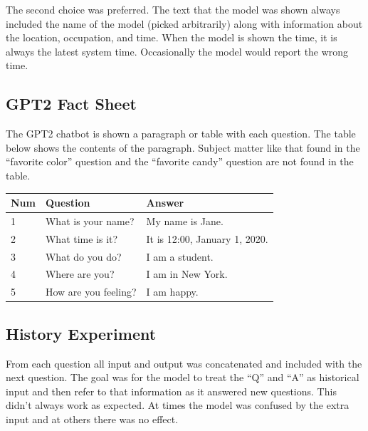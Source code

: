 The second choice was preferred. The text that the model was shown always included the name of the model (picked arbitrarily) along with information about the location, occupation, and time. When the model is shown the time, it is always the latest system time. Occasionally the model would report the wrong time. %

\subsection{GPT2 Fact Sheet}

The GPT2 chatbot is shown a paragraph or table with each question. The table below shows the contents of the paragraph. Subject matter like that found in the ``favorite color'' question and the ``favorite candy'' question are not found in the table.

\begin{table}[h]
	\begin{center}	
		
		\begin{tabular}{lll}
			Num & Question             & Answer                        \\
			\hline \hline
			1   & What is your name?   & My name is Jane.              \\
			2   & What time is it?     & It is 12:00, January 1, 2020. \\
			3   & What do you do?      & I am a student.               \\
			4   & Where are you?       & I am in New York.             \\
			5   & How are you feeling? & I am happy.                  \\
			\hline     
		\end{tabular}
	\end{center}
	\label{fig-fact-sheet}
	
\end{table}


\subsection{History Experiment}
From each question all input and output was concatenated and included with the next question. The goal was for the model to treat the ``Q'' and ``A'' as historical input and then refer to that information as it answered new questions. This didn't always work as expected. At times the model was confused by the extra input and at others there was no effect. 

